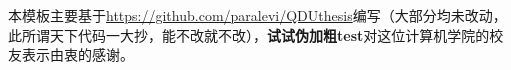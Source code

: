 \begin{thanks}
本模板主要基于\url{https://github.com/paralevi/QDUthesis}编写（大部分均未改动，此所谓天下代码一大抄，能不改就不改），\textbf{试试伪加粗test}对这位计算机学院的校友表示由衷的感谢。
\end{thanks}